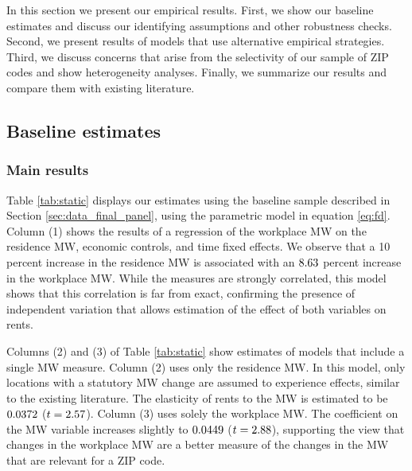 
In this section we present our empirical results.
First, we show our baseline estimates and discuss our identifying assumptions
and other robustness checks.
Second, we present results of models that use alternative empirical strategies.
Third, we discuss concerns that arise from the selectivity of our sample of 
ZIP codes and show heterogeneity analyses. 
Finally, we summarize our results and compare them with existing literature.

\subsection{Baseline estimates}
\label{sec:results_main}

\subsubsection{Main results}

Table \ref{tab:static} displays our estimates using the baseline sample 
described in Section \ref{sec:data_final_panel}, using the parametric model
in equation \eqref{eq:fd}.
Column (1) shows the results of a regression of the workplace MW on the 
residence MW, economic controls, and time fixed effects.
We observe that a 10 percent increase in the residence MW is associated with an
$8.63$ percent increase in the workplace MW.
While the measures are strongly correlated, this model shows that this 
correlation is far from exact, confirming the presence of independent variation
that allows estimation of the effect of both variables on rents.

Columns (2) and (3) of Table \ref{tab:static} show estimates of models that 
include a single MW measure.
Column (2) uses only the residence MW.
In this model, only locations with a statutory MW change are assumed to 
experience effects, similar to the existing literature.
The elasticity of rents to the MW is estimated to be 
$0.0372$ ($t=2.57$).
Column (3) uses solely the workplace MW.
The coefficient on the MW variable increases slightly to 
$0.0449$ ($t=2.88$), 
supporting the view that changes in the workplace MW are a better measure of 
the changes in the MW that are relevant for a ZIP code.

